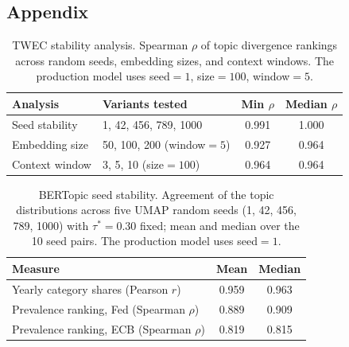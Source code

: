 \newpage
\begin{appendices}

\appendix
\renewcommand{\thetable}{A\arabic{table}}
\setcounter{table}{0}

\appendix
\renewcommand{\thefigure}{A\arabic{figure}}
\setcounter{figure}{0}
\section*{Appendix}\label{secA1}

\begin{table}[h!]
    \centering
    \caption{TWEC stability analysis. Spearman $\rho$ of topic divergence rankings across
             random seeds, embedding sizes, and context windows. The production model uses
             seed$=1$, size$=100$, window$=5$.}
    \label{tab:twec_stability}
    \begin{tabular}{l l c c}
        \hline
        \textbf{Analysis} & \textbf{Variants tested} & \textbf{Min $\rho$} & \textbf{Median $\rho$} \\
        \hline
        Seed stability    & 1, 42, 456, 789, 1000          & 0.991 & 1.000 \\
        Embedding size    & 50, 100, 200 (window$=5$)      & 0.927 & 0.964 \\
        Context window    & 3, 5, 10 (size$=100$)          & 0.964 & 0.964 \\
        \hline
    \end{tabular}
\end{table}

\begin{table}[h!]
    \centering
    \caption{BERTopic seed stability. Agreement of the topic distributions across five UMAP
             random seeds (1, 42, 456, 789, 1000) with $\tau^*=0.30$ fixed; mean and median over the
             10 seed pairs. The production model uses seed$=1$.}
    \label{tab:bertopic_stability}
    \begin{tabular}{l c c}
        \hline
        \textbf{Measure} & \textbf{Mean} & \textbf{Median} \\
        \hline
        Yearly category shares (Pearson $r$)      & 0.959 & 0.963 \\
        Prevalence ranking, Fed (Spearman $\rho$) & 0.889 & 0.909 \\
        Prevalence ranking, ECB (Spearman $\rho$) & 0.819 & 0.815 \\
        \hline
    \end{tabular}
\end{table}



\end{appendices}
